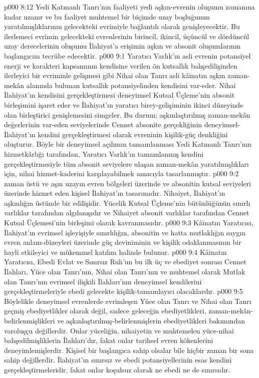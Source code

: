 \vs p000 8:12 Yedi Katmanlı Tanrı’nın faaliyeti yedi aşkın\hyp{}evrenin oluşumu zamanına kadar uzanır ve bu faaliyet muhtemel bir biçimde uzay boşluğunun yaratılmışlıklarının gelecekteki evrimiyle bağlantılı olarak genişleyecektir. Bu ilerlemeci evrimin gelecekteki evrenlerinin birincil, ikincil, üçüncül ve dördüncül uzay derecelerinin oluşumu İlahiyat’a erişimin aşkın ve absonit oluşumlarının başlangıcını tecrübe edecektir.
\vs p000 9:1 Yaratıcı Varlık’ın asli evrenin potansiyel enerji ve karakteri kapsamının kendisine verilen ön kutsallık bahşedilişinden ilerleyici bir evriminle gelişmesi gibi Nihai olan Tanrı asli kâinatın aşkın zaman\hyp{}mekân alanında bulunan kutsallık potansiyelinden kendisini var\hyp{}eder. Nihai İlahiyat’ın kendisini gerçekleştirmesi deneyimsel Kutsal Üçleme’nin absonit birleşimini işaret eder ve İlahiyat’ın yaratıcı birey\hyp{}gelişiminin ikinci düzeyinde olan birleştirici genişlemesini simgeler. Bu durum; aşkınlaştırılmış zaman\hyp{}mekân değerlerinin var\hyp{}eden seviyelerinde Cennet absonite gerçekliğinin deneyimsel\hyp{}İlahiyat’ın kendini gerçekleştirmesi olarak evreninin kişilik\hyp{}güç denkliğini oluşturur. Böyle bir deneyimsel açılımın tamamlanması Yedi Katmanlı Tanrı’nın hizmetkârlığı tarafından, Yaratıcı Varlık’ın tamamlanmış kendini gerçekleştirmesiyle tüm absonit seviyelere ulaşan zaman\hyp{}mekân yaratılmışlıkları için, nihai hizmet\hyp{}kaderini karşılayabilmek amacıyla tasarlanmıştır.
\vs p000 9:2 zaman üstü ve aşın uzayın evren bölgeleri üzerinde ve absonitin kutsal seviyeleri üzerinde hizmet eden kişisel İlahiyat’ın tasarımıdır. Nihaiyet, İlahiyat’ın aşkınlığın üstünde bir edilişidir. Yücelik Kutsal Üçleme’nin bütünlüğünün sınırlı varlıklar tarafından algılanışıdır ve Nihaiyet absonit varlıklar tarafından Cennet Kutsal Üçlemesi’nin birleşimi olarak kavranmasıdır.
\vs p000 9:3 Kâinatın Yaratıcısı, İlahiyat’ın evrimsel işleyişiyle sınırlılığın, absonitin ve hatta mutlaklığın saygın evren anlam\hyp{}düzeyleri üzerinde güç deviniminin ve kişilik odaklanmasının bir hayli etkileyici ve mükemmel  katılım halinde bulunur.
\vs p000 9:4 Kâinatın Yaratıcısı, Ebedi Evlat ve Sınırsız Ruh’un bu ilk üç ve ebediyet sonrası Cennet İlahları, Yüce olan Tanrı’nın, Nihai olan Tanrı’nın ve muhtemel olarak Mutlak olan Tanrı’nın evrimsel ilişkili İlahları’nın deneyimsel kendilerini gerçekleştirmeleriyle ebedi gelecekte kişilik\hyp{}tamamlayıcı olacaklardır.
\vs p000 9:5 Böylelikle deneyimsel evrenlerde evrimleşen Yüce olan Tanrı ve Nihai olan Tanrı geçmiş ebediyetlikler olarak değil, sadece geleceğin ebediyetlikleri, zaman\hyp{}mekân\hyp{}belirlenmişlikleri ve aşkınlaştırılmış\hyp{}belirlenmişlerin ebediyetlikleri bakımından varoluşçu değillerdir. Onlar yüceliğin, nihaiyetin ve muhtemelen yüce\hyp{}nihai bahşedilmişliklerin İlahları’dır, fakat onlar tarihsel evren kökenlerini deneyimlemişlerdir. Kişisel bir başlangıca sahip olsalar bile hiçbir zaman bir sona sahip değillerdir. İlahiyat’ın sınırsız ve ebedi potansiyellerinin esas kendini gerçekleştirmeleridir, fakat onlar koşulsuz olarak ne ebedi ne de sınırsıdır.
